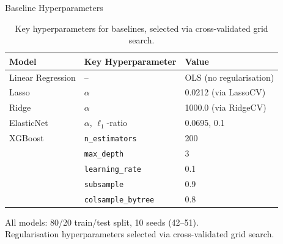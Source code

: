 \documentclass[aspectratio=169, 10pt]{beamer}
\begin{document}
\begin{frame}{Baseline Hyperparameters}
\footnotesize
\begin{table}
\centering
\begin{tabular}{@{}lll@{}}
\toprule
\textbf{Model} & \textbf{Key Hyperparameter} & \textbf{Value} \\
\midrule
Linear Regression & -- & OLS (no regularisation) \\
Lasso             & $\alpha$ & 0.0212 (via LassoCV) \\
Ridge             & $\alpha$ & 1000.0 (via RidgeCV) \\
ElasticNet        & $\alpha$, $\ell_1$-ratio & 0.0695, 0.1 \\
\midrule
XGBoost           & \texttt{n\_estimators}    & 200 \\
                  & \texttt{max\_depth}       & 3 \\
                  & \texttt{learning\_rate}   & 0.1 \\
                  & \texttt{subsample}        & 0.9 \\
                  & \texttt{colsample\_bytree} & 0.8 \\
\bottomrule
\end{tabular}
\caption{Key hyperparameters for baselines, selected via cross-validated grid search.}
\end{table}

All models: 80/20 train/test split, 10 seeds (42--51).\\
Regularisation hyperparameters selected via cross-validated grid search.
\end{frame}
\end{document}
